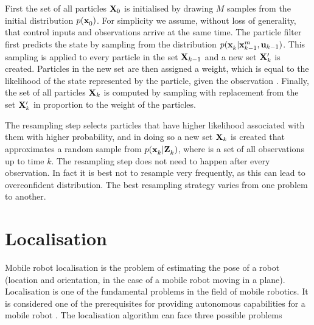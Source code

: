 First the set of all particles ${\bf X}_0$ is initialised by drawing
$M$ samples from the initial distribution $p(\x{0}{}{})$. For
simplicity we assume, without loss of generality, that control
inputs and observations arrive at the same time. The particle filter
first predicts the state by sampling from the distribution
$p(\x{k}{}{} | \x{k-1}{}{m}, \U{k-1})$. This sampling is applied to
every particle in the set ${\bf X}_{k-1}$ and a new set ${\bf
X}_k^\prime$ is created. Particles in the new set are then assigned a
weight, which is equal to the likelihood of the state represented by
the particle, given the observation . Finally, the set of all
particles ${\bf X}_k$ is computed by sampling with replacement from
the set ${\bf X}_k^\prime$ in proportion to the weight of the
particles.

The resampling step selects particles that have higher likelihood
associated with them with higher probability, and in doing so a new
set ${\bf X}_k$ is created that approximates a random sample from
$p(\x{k}{}{}|\Zall{k}{})$, where  is a set of all
observations up to time $k$. The resampling step does not need to
happen after every observation. In fact it is best not to resample
very frequently, as this can lead to overconfident distribution. The
best resampling strategy varies from one problem to
another. 



\section{Localisation} 
\label{sec:Localisation}


Mobile robot localisation is the problem of estimating the pose of a
robot (location and orientation, in the case of a mobile robot moving
in a plane). Localisation is one of the fundamental problems in the
field of mobile robotics. It is considered one of the prerequisites
for providing autonomous capabilities for a mobile robot \cite{Cox91}.
The localisation algorithm can face three possible problems

